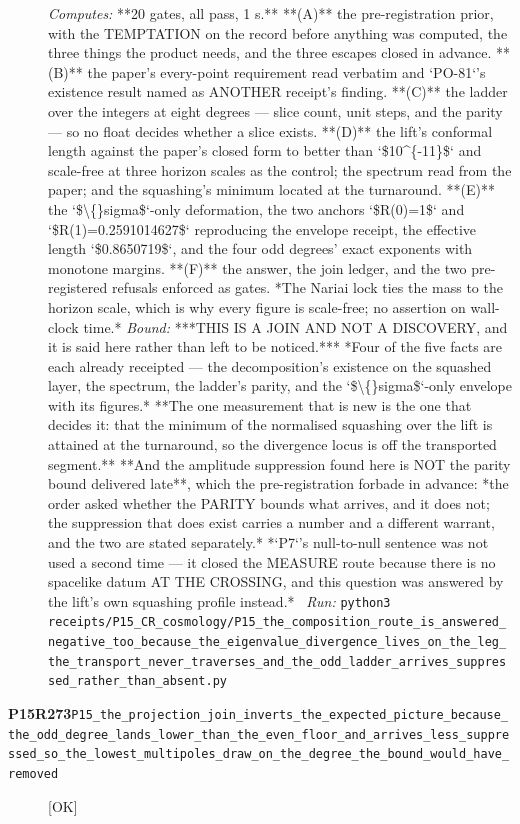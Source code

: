 \begin{description}
\emph{Computes:} **20 gates, all pass, 1 s.** **(A)** the pre-registration prior, with the TEMPTATION on the record before anything was computed, the three things the product needs, and the three escapes closed in advance. **(B)** the paper's every-point requirement read verbatim and `PO-81`'s existence result named as ANOTHER receipt's finding. **(C)** the ladder over the integers at eight degrees --- slice count, unit steps, and the parity --- so no float decides whether a slice exists. **(D)** the lift's conformal length against the paper's closed form to better than `\$10\textasciicircum{}\{-11\}\$` and scale-free at three horizon scales as the control; the spectrum read from the paper; and the squashing's minimum located at the turnaround. **(E)** the `\$\textbackslash\{\}sigma\$`-only deformation, the two anchors `\$R(0)=1\$` and `\$R(1)=0.2591014627\$` reproducing the envelope receipt, the effective length `\$0.8650719\$`, and the four odd degrees' exact exponents with monotone margins. **(F)** the answer, the join ledger, and the two pre-registered refusals enforced as gates. *The Nariai lock ties the mass to the horizon scale, which is why every figure is scale-free; no assertion on wall-clock time.*
 \emph{Bound:}  ***THIS IS A JOIN AND NOT A DISCOVERY, and it is said here rather than left to be noticed.*** *Four of the five facts are each already receipted --- the decomposition's existence on the squashed layer, the spectrum, the ladder's parity, and the `\$\textbackslash\{\}sigma\$`-only envelope with its figures.* **The one measurement that is new is the one that decides it: that the minimum of the normalised squashing over the lift is attained at the turnaround, so the divergence locus is off the transported segment.**  **And the amplitude suppression found here is NOT the parity bound delivered late**, which the pre-registration forbade in advance: *the order asked whether the PARITY bounds what arrives, and it does not; the suppression that does exist carries a number and a different warrant, and the two are stated separately.*  *`P7`'s null-to-null sentence was not used a second time --- it closed the MEASURE route because there is no spacelike datum AT THE CROSSING, and this question was answered by the lift's own squashing profile instead.*
\ \emph{Run:} \texttt{python3 receipts/P15\_CR\_cosmology/P15\_the\_composition\_route\_is\_answered\_negative\_too\_because\_the\_eigenvalue\_divergence\_lives\_on\_the\_leg\_the\_transport\_never\_traverses\_and\_the\_odd\_ladder\_arrives\_suppressed\_rather\_than\_absent.py}
\item[\rcptlabel{P15_the_projection_join_inverts_the_expected_picture_because_the_odd_degree_lands_lower_than_the_even_floor_and_arrives_less_suppressed_so_the_lowest_multipoles_draw_on_the_degree_the_bound_would_have_removed}{P15R273}\textbf{P15R273}\quad\texttt{P15\_the\_projection\_join\_inverts\_the\_expected\_picture\_because\_the\_odd\_degree\_lands\_lower\_than\_the\_even\_floor\_and\_arrives\_less\_suppressed\_so\_the\_lowest\_multipoles\_draw\_on\_the\_degree\_the\_bound\_would\_have\_removed}]\hfill\textsf{[OK]}\\

\end{description}
